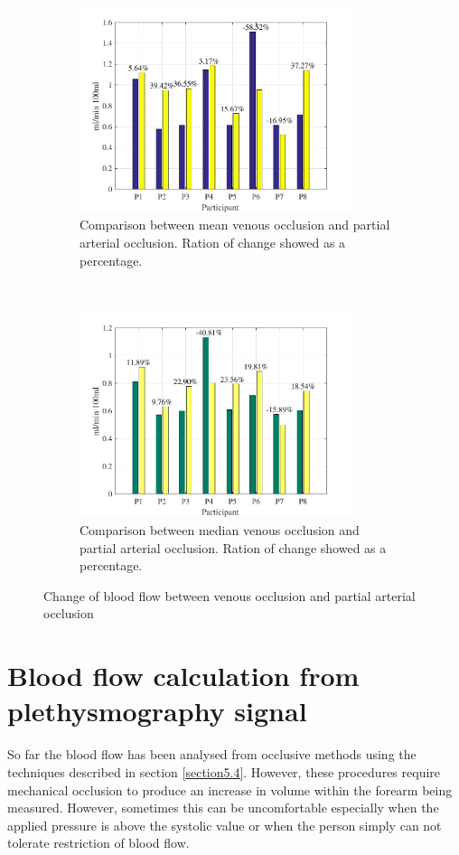 \begin{figure}[t!]
	\centering
	\begin{subfigure}[t]{0.5\textwidth}
		\centering
		\includegraphics[height=6cm,keepaspectratio]{figure14a}    
		\caption{Comparison between mean venous occlusion and partial arterial occlusion. Ration of change showed as a percentage.}
		\label{fig:change_flow_mean}
	\end{subfigure}%
	~ 
	\begin{subfigure}[t]{0.5\textwidth}
		\centering
		\includegraphics[height=6cm,keepaspectratio,keepaspectratio]{figure14b}    
		\caption{Comparison between median venous occlusion and partial arterial occlusion. Ration of change showed as a percentage.}
		\label{fig:change_flow_median}
	\end{subfigure}
	\caption{Change of blood flow between venous occlusion and partial arterial occlusion}
	\label{fig:iPG_flow_comparative}
\end{figure}


\section{Blood flow calculation from plethysmography signal}
\label{section5.5}
So far the blood flow has been analysed from occlusive methods using the techniques described in section \ref{section5.4}. However, these procedures require mechanical occlusion to produce an increase in volume within the forearm being measured. However, sometimes this can be uncomfortable especially when the applied pressure is above the systolic value or when the person simply can not tolerate restriction of blood flow.

